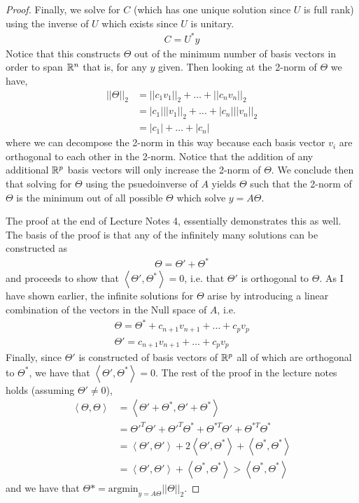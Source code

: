 \documentclass{article}
\begin{document}
\begin{proof}
    Finally, we solve for $C$ (which has one unique solution since $U$ is full
    rank) using the inverse of $U$ which exists since $U$ is
    unitary. 
    \begin{gather*}
        C = U^*y
    \end{gather*}
    Notice that this constructs $\Theta$ out of the minimum number of basis
    vectors in order to span $\mathbb{R}^{n}$ that is, for any $y$ given. Then looking at
    the 2-norm of $\Theta$ we have, 
    \begin{align*}
        ||\Theta||_2 &= ||c_1v_1||_2 + \ldots + ||c_nv_n||_2\\
         &= |c_1|||v_1||_2 + \ldots + |c_n|||v_n||_2\\
         &= |c_1| + \ldots + |c_n|
    \end{align*}
    where we can decompose the 2-norm in this way because each basis vector
    $v_i$ are orthogonal to each other in the 2-norm. Notice that the addition
    of any additional $\mathbb{R}^{p}$ basis vectors will only increase the 2-norm of
    $\Theta$. We conclude then that solving for $\Theta$ using the psuedoinverse
    of $A$ yields $\Theta$ such that the 2-norm of $\Theta$ is the minimum out
    of all possible $\Theta$ which solve $y=A\Theta$. 

    The proof at the end of Lecture Notes 4, essentially demonstrates this as
    well. The basis of the proof is that any of the infinitely many solutions
    can be constructed as
    \begin{gather*}
        \Theta = \Theta' + \Theta^*
    \end{gather*}
    and proceeds to show that $\left<\Theta', \Theta^*\right> = 0$, i.e. that
    $\Theta'$ is orthogonal to $\Theta$. As I have shown earlier, the infinite
    solutions for $\Theta$ arise by introducing a linear combination of the
    vectors in the Null space of $A$, i.e.
    \begin{gather*}
        \Theta = \Theta^* + c_{n+1}v_{n+1} + \ldots + c_pv_p\\
        \Theta' = c_{n+1}v_{n+1} + \ldots + c_pv_p
    \end{gather*}
    Finally, since $\Theta'$ is constructed of basis vectors of $\mathbb{R}^p$ all of
    which are orthogonal to $\Theta^*$, we have that
    $\left<\Theta',\Theta^*\right> = 0$. The rest of the proof in the lecture
    notes holds (assuming $\Theta' \ne 0$), 
    \begin{align*}
        \left<\Theta, \Theta\right> &=
        \left<\Theta'+\Theta^*,\Theta'+\Theta^*\right>\\
        &= \Theta'^T\Theta' + \Theta'^T\Theta^* + \Theta^{*T}\Theta' +
        \Theta^{*T}\Theta^*\\
        &= \left<\Theta',\Theta'\right> + 2\left<\Theta',\Theta^*\right> +
        \left<\Theta^*, \Theta^*\right>\\
        &= \left<\Theta',\Theta'\right> + \left<\Theta^*,\Theta^*\right> > \left<\Theta^*,\Theta^*\right>
    \end{align*}
    and we have that $\Theta* = \text{argmin}_{y=A\Theta}||\Theta||_2$. 

\end{proof}
\end{document}
